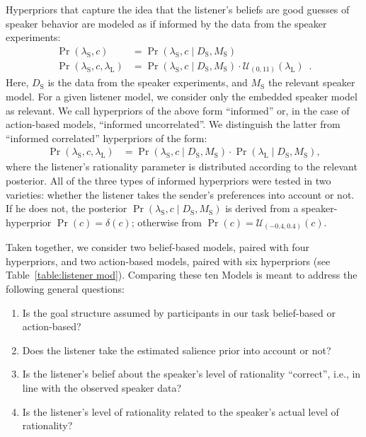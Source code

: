 Hyperpriors that capture the idea that the listener's beliefs are good
guesses of speaker behavior are modeled as if informed by the data
from the speaker experiments:
\begin{align*}
  \Pr(\lambda_\mathrm{S},c) & = \Pr(\lambda_\mathrm{S},c \mid D_\mathrm{S}, M_\mathrm{S}) \\
  \Pr(\lambda_\mathrm{S},c,\lambda_\mathrm{L}) & = 
   \Pr(\lambda_\mathrm{S},c \mid D_\mathrm{S}, M_\mathrm{S}) \cdot  \mathcal{U}_{(0,11)}(
    \lambda_\mathrm{L}) \enspace .
\end{align*}
Here, $D_\mathrm{S}$ is the data from the speaker experiments, and
$M_\mathrm{S}$ the relevant speaker model. For a given listener model,
we consider only the embedded speaker model as relevant. We call
hyperpriors of the above form ``informed'' or, in the case of
action-based models, ``informed uncorrelated''. We distinguish the
latter from ``informed correlated'' hyperpriors of the form:
\begin{align*}
  \Pr(\lambda_\mathrm{S},c,\lambda_\mathrm{L}) & = 
   \Pr(\lambda_\mathrm{S},c \mid D_\mathrm{S}, M_\mathrm{S}) \cdot \Pr(\lambda_\mathrm{L} \mid D_\mathrm{S}, M_\mathrm{S}),
\end{align*}
where the listener's rationality parameter is distributed according to
the relevant posterior. All of the three types of informed hyperpriors
were tested in two varieties: whether the listener takes the sender's
preferences into account or not. If he does not, the posterior
$\Pr(\lambda_\mathrm{S},c \mid D_\mathrm{S}, M_\mathrm{S})$ is derived
from a speaker-hyperprior $\Pr(c) = \delta(c)$; otherwise from $\Pr(c)
= \mathcal{U}_{(-0.4,0.4)}(c)$.

Taken together, we consider two belief-based models, paired with four
hyperpriors, and two action-based models, paired with six hyperpriors
(see Table~\ref{table:listener mod}). Comparing these ten Models is
meant to address the following general questions:
\begin{enumerate}
\item Is the goal structure assumed by participants in our task
  belief-based or action-based?
\item Does the listener take the estimated salience prior into account
  or not?
\item Is the listener's belief about the speaker's level of rationality
  ``correct'', i.e., in line with the observed speaker data?
\item Is the listener's level of rationality related to the speaker's
  actual level of rationality?
\end{enumerate}

